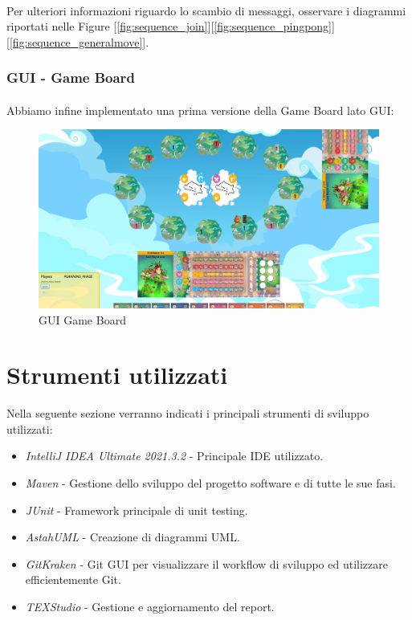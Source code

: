 \documentclass[a4paper, 12pt]{article}
\begin{document}
	\paragraph{}
	Per ulteriori informazioni riguardo lo scambio di messaggi, osservare i diagrammi riportati nelle Figure [\ref{fig:sequence_join}][\ref{fig:sequence_pingpong}][\ref{fig:sequence_generalmove}].
	\subsubsection{GUI - Game Board}
	\paragraph{}
	Abbiamo infine implementato una prima versione della Game Board lato GUI:\\
	\begin{figure}[h!]
		\centering
		\includegraphics[scale=0.2]{guiGameBoard.png}
		\caption{GUI Game Board}
	\end{figure}
	
	\newpage
	\section{Strumenti utilizzati}
	Nella seguente sezione verranno indicati i principali strumenti di sviluppo utilizzati:\\
	\begin{itemize}
		\setlength{\parskip}{0pt}
		\setlength{\parsep}{0pt}
		
		\item \emph{IntelliJ IDEA Ultimate 2021.3.2} - Principale IDE utilizzato.
		\item \emph{Maven} - Gestione dello sviluppo del progetto software e di tutte le sue fasi.
		\item \emph{JUnit} - Framework principale di unit testing.
		\item \emph{AstahUML} - Creazione di diagrammi UML.
		\item \emph{GitKraken} - Git GUI per visualizzare il workflow di sviluppo ed utilizzare efficientemente Git.
		\item \emph{TEXStudio} - Gestione e aggiornamento del report.
	\end{itemize}
\end{document}

